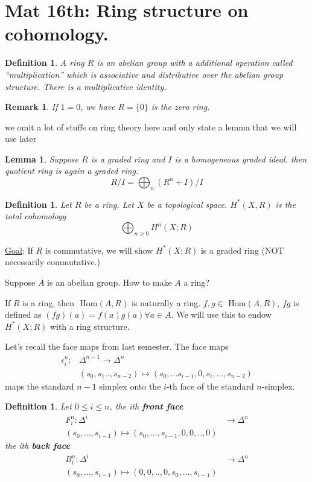 \documentclass[11pt]{article}
\newtheorem{lemma}[thm]{Lemma}
\newtheorem{dfn}[thm]{Definition}
\newtheorem{rmk}[thm]{Remark}
\renewcommand{\hom}{\text{ Hom}}
\newcommand{\lrta}{\longrightarrow}
\begin{document}
\section{Mat 16th: Ring structure on cohomology.}

\begin{dfn}
A ring $R$ is an abelian group with a additional  operation called ``multiplication'' which is associative and distributive over the abelian group structure. There is a multiplicative identity.
\end{dfn}

\begin{rmk}
If $1=0$, we have $R=\{0\}$ is the zero ring.
\end{rmk}

we omit a lot of stuffs on ring theory here and only state a lemma that we will use later
\begin{lemma}
Suppose $R$ is a graded ring and $I$ is a homogeneous graded ideal. then quotient ring is again a graded ring. 
$$
R/I=\bigoplus_n(R^n+I)/I
$$
\end{lemma}

\begin{dfn}
Let $R$ be a ring. Let $X$ be a topological space. 
$H^*(X,R)$ is the total cohomology
$$
\bigoplus_{n\geq 0} H^n(X;R)
$$
\end{dfn}

\underline{Goal}: If $R$ is  commutative, we will show $H^*(X;R) $ is a graded ring (NOT necessarily  commutative.)

Suppose $A$ is an abelian group. How to make $A$ a ring?

If $R$ is a ring, then $\hom(A,R)$ is naturally a ring.
$f,g\in\hom(A,R)$, $fg$ is defined as $(fg)(a)=f(a)g(a)\forall a\in A$. We will use this to endow $H^*(X;R)$ with a ring structure.

Let's recall the face maps from last semester. The face maps 
$$
\begin{aligned}
\epsilon^n_i:&\Delta^{n-1}\lrta \Delta^n\\
&(s_0,s_1..,s_{n-2})\mapsto (s_0,...s_{i-1}, 0,s_{i},...,s_{n-2})
\end{aligned}
$$
maps the standard $n-1$ simplex onto the $i$-th face of the standard $n$-simplex.

\begin{dfn}
Let $0\leq i\leq n$, the ith \textbf{front face}
$$
\begin{aligned}
F_i^n:\Delta^i&\lrta \Delta^n\\
(s_0,...,s_{i-1})\mapsto (s_0,...,s_{i-1},0,0,..,0)
\end{aligned}
$$
the ith \textbf{back face}
$$
\begin{aligned}
B_i^n:\Delta^i&\lrta \Delta^n\\
(s_0,...,s_{i-1})\mapsto (0,0,..,0,s_0,...,s_{i-1})
\end{aligned}
$$
\end{dfn}
\end{document}
